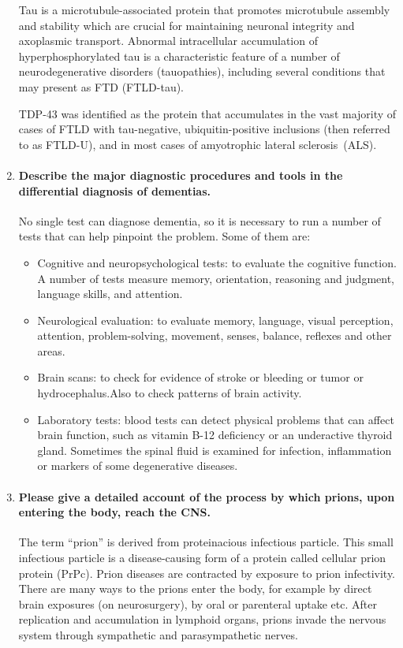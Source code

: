 \documentclass[12pt,article,oneside,a4paper]{memoir}
\begin{document}
\begin{enumerate}
Tau is a microtubule-associated protein that promotes microtubule assembly and
stability which are crucial for maintaining neuronal integrity and axoplasmic
transport. Abnormal intracellular accumulation of hyperphosphorylated tau is a
characteristic feature of a number of neurodegenerative disorders
(tauopathies), including several conditions that may present as FTD (FTLD-tau).

TDP-43 was identified as the protein that accumulates in the vast majority of
cases of FTLD with tau-negative, ubiquitin-positive inclusions (then referred
to as FTLD-U), and in most cases of amyotrophic lateral sclerosis~(ALS).


\item \paragraph{Describe the major diagnostic procedures and tools in the
differential diagnosis of dementias.}

No single test can diagnose dementia, so it is necessary to run a number of
tests that can help pinpoint the problem. Some of them are:
\begin{itemize}
\item Cognitive and neuropsychological tests: to evaluate the cognitive
function. A number of tests measure memory, orientation, reasoning and
judgment, language skills, and attention.
\item Neurological evaluation: to evaluate memory, language, visual perception,
attention, problem-solving, movement, senses, balance, reflexes and other
areas.
\item Brain scans: to check for evidence of stroke or bleeding or tumor or
hydrocephalus.Also to check patterns of brain activity.
\item Laboratory tests: blood tests can detect physical problems that can
affect brain function, such as vitamin B-12 deficiency or an underactive
thyroid gland. Sometimes the spinal fluid is examined for infection,
inflammation or markers of some degenerative diseases.
\end{itemize}

\item \paragraph{Please give a detailed account of the process by which prions,
upon entering the body, reach the CNS.}

The term ``prion'' is derived from proteinacious infectious particle. This
small infectious particle is a disease-causing form of a protein called
cellular prion protein (PrPc). Prion diseases are contracted by exposure to
prion infectivity. There are many ways to the prions enter the body, for
example by direct brain exposures (on neurosurgery), by oral or parenteral
uptake etc.
After replication and accumulation in lymphoid organs, prions invade the
nervous system through sympathetic and parasympathetic nerves.

\end{enumerate}
\end{document}
